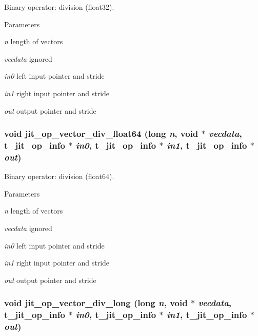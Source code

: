 Binary operator: division (float32). 
\begin{DoxyParams}{Parameters}
\item[{\em n}]length of vectors \item[{\em vecdata}]ignored \item[{\em in0}]left input pointer and stride \item[{\em in1}]right input pointer and stride \item[{\em out}]output pointer and stride \end{DoxyParams}
\hypertarget{group__opvecmod_ga508039e2b5d271fda853ff5cc16fd619}{
\subsubsection[{jit\_\-op\_\-vector\_\-div\_\-float64}]{\setlength{\rightskip}{0pt plus 5cm}void jit\_\-op\_\-vector\_\-div\_\-float64 (long {\em n}, \/  void $\ast$ {\em vecdata}, \/  {\bf t\_\-jit\_\-op\_\-info} $\ast$ {\em in0}, \/  {\bf t\_\-jit\_\-op\_\-info} $\ast$ {\em in1}, \/  {\bf t\_\-jit\_\-op\_\-info} $\ast$ {\em out})}}
\label{group__opvecmod_ga508039e2b5d271fda853ff5cc16fd619}


Binary operator: division (float64). 
\begin{DoxyParams}{Parameters}
\item[{\em n}]length of vectors \item[{\em vecdata}]ignored \item[{\em in0}]left input pointer and stride \item[{\em in1}]right input pointer and stride \item[{\em out}]output pointer and stride \end{DoxyParams}
\hypertarget{group__opvecmod_ga1d3e0b24be891526c13c4f0365250d9d}{
\subsubsection[{jit\_\-op\_\-vector\_\-div\_\-long}]{\setlength{\rightskip}{0pt plus 5cm}void jit\_\-op\_\-vector\_\-div\_\-long (long {\em n}, \/  void $\ast$ {\em vecdata}, \/  {\bf t\_\-jit\_\-op\_\-info} $\ast$ {\em in0}, \/  {\bf t\_\-jit\_\-op\_\-info} $\ast$ {\em in1}, \/  {\bf t\_\-jit\_\-op\_\-info} $\ast$ {\em out})}}
\label{group__opvecmod_ga1d3e0b24be891526c13c4f0365250d9d}


